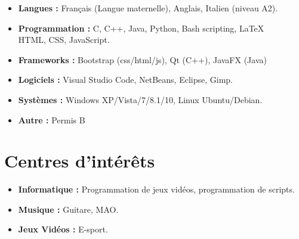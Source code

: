 \documentclass[11pt,a4paper,sans]{moderncv}
\begin{document}
\begin{itemize}

\item \textbf{Langues :} Français (Langue maternelle), Anglais, Italien (niveau A2).

\vspace{6pt}

\item \textbf{Programmation :} C, C++, Java, Python, Bash scripting, LaTeX \\
HTML, CSS, JavaScript.

\vspace{6pt}

\item \textbf{Frameworks :} Bootstrap (css/html/js), Qt (C++), JavaFX (Java)

\vspace{6pt}

\item \textbf{Logiciels :} Visual Studio Code, NetBeans, Eclipse, Gimp.

\vspace{6pt}

\item \textbf{Systèmes :} Windows XP/Vista/7/8.1/10, Linux Ubuntu/Debian.

\vspace{6pt}

\item \textbf{Autre :} Permis B

\end{itemize}

\section{Centres d'intérêts}

\vspace{6pt}

\begin{itemize}

\item \textbf{Informatique :} Programmation de jeux vidéos, programmation de 
scripts.
\vspace {6pt}
\item \textbf{Musique :} Guitare, MAO.
\vspace{6pt}
\item \textbf{Jeux Vidéos :} E-sport.

\end{itemize}
\end{document}
